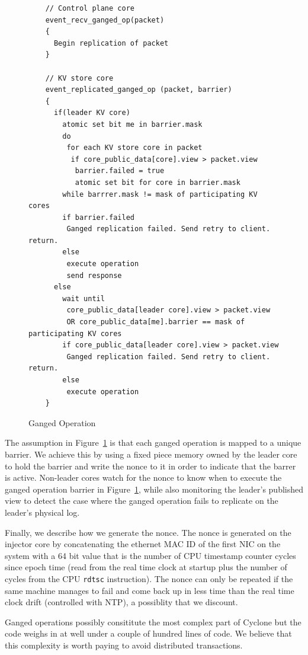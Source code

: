 \documentclass[10pt, preprint, nonatbib]{sigplanconf}
\begin{document}
\begin{figure}
  \centering
\begin{verbatim}
    // Control plane core
    event_recv_ganged_op(packet)
    {
      Begin replication of packet
    }

    // KV store core
    event_replicated_ganged_op (packet, barrier)
    {
      if(leader KV core)
        atomic set bit me in barrier.mask         
        do
         for each KV store core in packet
          if core_public_data[core].view > packet.view
           barrier.failed = true 
           atomic set bit for core in barrier.mask
        while barrrer.mask != mask of participating KV cores
        if barrier.failed
         Ganged replication failed. Send retry to client. return.
        else       
         execute operation
         send response
      else
        wait until 
         core_public_data[leader core].view > packet.view
         OR core_public_data[me].barrier == mask of participating KV cores
        if core_public_data[leader core].view > packet.view
         Ganged replication failed. Send retry to client. return.
        else
         execute operation
    }
\end{verbatim}
\caption{Ganged Operation}
\label{fig:ganged_ops}
\end{figure}

The assumption in Figure~\ref{fig:ganged_ops} is that each ganged operation is
mapped to a unique barrier. We achieve this by using a fixed piece memory owned
by the leader core to hold the barrier and write the nonce to it in order to
indicate that the barrer is active. Non-leader cores watch for the nonce to know
when to execute the ganged operation barrier in Figure~\ref{fig:ganged_ops},
while also monitoring the leader's published view to detect the case where the
ganged operation fails to replicate on the leader's physical log.

Finally, we describe how we generate the nonce. The nonce is generated on the
injector core by concatenating the ethernet MAC ID of the first NIC on the
system with a 64 bit value that is the number of CPU timestamp counter cycles
since epoch time (read from the real time clock at startup plus the number of
cycles from the CPU {\tt rdtsc} instruction). The nonce can only be repeated if
the same machine manages to fail and come back up in less time than the real
time clock drift (controlled with NTP), a possiblity that we discount.

Ganged operations possibly consititute the most complex part of Cyclone but the
code weighs in at well under a couple of hundred lines of code. We believe that
this complexity is worth paying to avoid distributed transactions.
\end{document}
